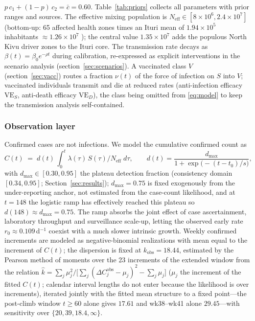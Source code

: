 \documentclass[10pt]{plos}
\begin{document}
$p\,c_1+(1-p)\,c_2=\bar c=0.60$. Table~\ref{tab:priors} collects all
parameters with prior ranges and sources. The effective mixing
population is $N_{\mathrm{eff}}\in[8\times10^6,2.4\times10^7]$
(bottom-up: 65 affected health zones times an Ituri mean of
$1.94\times10^5$ inhabitants $\approx1.26\times10^7$
\cite{SSHAP2026,KhethImpilo2026}); the central value $1.35\times10^7$
adds the populous North Kivu driver zones to the Ituri core. The
transmission rate decays as $\beta(t)=\beta_0 e^{-\rho t}$ during
calibration, re-expressed as explicit interventions in the scenario
analysis (section~\ref{sec:scenarios}). A vaccinated class $V$
(section~\ref{sec:vacc}) routes a fraction $\nu(t)$ of the force of
infection on $S$ into $V$; vaccinated individuals transmit and die at
reduced rates (anti-infection efficacy $\mathrm{VE}_S$, anti-death
efficacy $\mathrm{VE}_D$), the class being omitted from \eqref{eq:model}
to keep the transmission analysis self-contained.
\subsubsection{Observation layer}\label{sec:obsmodel}

Confirmed cases are not infections. We model the cumulative confirmed
count as
\begin{equation}\label{eq:obs}
C(t) \;=\; d(t)\,\textstyle\int_0^t \lambda(\tau)\, S(\tau)/N_{\mathrm{eff}}\;d\tau, \qquad
d(t) = \frac{d_{\max}}{1+\exp\!\big(-(t-t_0)/s\big)},
\end{equation}
with $d_{\max}\in[0.30,0.95]$ the plateau detection fraction
(consistency domain $[0.34,0.95]$; Section~\ref{sec:results}); $d_{\max}=0.75$
is fixed exogenously from the under-reporting anchor, not estimated from the
case-count likelihood, and at $t=148$ the logistic ramp has effectively reached
this plateau so $d(148)\approx d_{\max}=0.75$. The ramp
absorbs the joint effect of case ascertainment, laboratory throughput
and surveillance scale-up, letting the observed early rate
$r_0\approx0.109\,$d$^{-1}$ coexist with a much slower intrinsic growth.
Weekly confirmed increments are modeled as negative-binomial realizations
with mean equal to the increment of $C(t)$; the dispersion is fixed at
$k_{\mathrm{obs}}=18.44$, estimated by the Pearson method of moments over
the 23 increments of the extended window from the relation
$\hat k=\sum_j\mu_j^2\big/\bigl[\sum_j(\Delta C_j^{\mathrm{obs}}-\mu_j)^2-\sum_j\mu_j\big]$
($\mu_j$ the increment of the fitted $C(t)$; calendar interval lengths
do not enter because the likelihood is over increments), iterated jointly
with the fitted mean structure to a fixed point---the post-climb window
$t\ge60$ alone gives $17.61$ and wk38--wk41 alone $29.45$---with
sensitivity over $\{20,39,18.4,\infty\}$.
\end{document}
